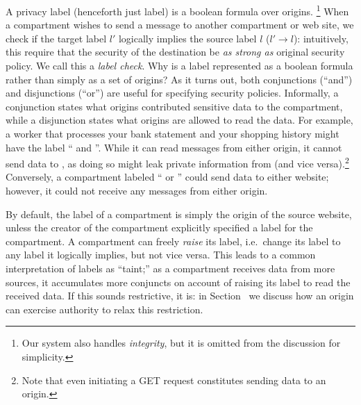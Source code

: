 A privacy label (henceforth just label) is a boolean formula over
origins.%
%
\footnote{
  Our system also handles \emph{integrity}, but it is omitted from
  the discussion for simplicity.
}
%
When a compartment wishes to send a message to another compartment or
web site, we check if the target label $l'$ logically implies the source
label $l$ ($l' \rightarrow l$): intuitively, this require that the security of the destination be
\emph{as strong as} original security policy.
%
We call this a \emph{label check}.
%
Why is a label represented as a boolean formula rather than simply
as a set of origins?
%
As it turns out, both conjunctions (``and'')
and disjunctions (``or'') are useful for specifying security policies.
%
Informally, a conjunction states what origins contributed sensitive data
to the compartment, while a disjunction states what origins are allowed
to read the data.
%
For example, a worker that processes your bank statement and your shopping
history might have the label `` and ''.
%
While it can read messages from either origin, it cannot send data to
, as doing so might leak private information from
 (and vice versa).\footnote{Note that even initiating a
GET request constitutes sending data to an origin.}
%
Conversely, a compartment labeled `` or ''
could send data to either website; however, it could not receive any
messages from either origin.

By default, the label of a compartment is simply the origin of the
source website, unless the creator of the compartment explicitly
specified a label for the compartment.
%
A compartment can freely \emph{raise} its label, i.e.\ change its label
to any label it logically implies, but not vice versa.
%
This leads to a common interpretation of labels as ``taint;'' as
a compartment receives data from more sources, it accumulates more
conjuncts on account of raising its label to read the received data.
%
If this sounds restrictive, it is: in Section~ we discuss how
an origin can exercise authority to relax this restriction.

